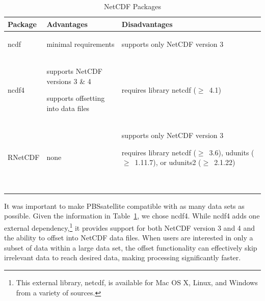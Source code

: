 \documentclass[11pt]{report}
\begin{document}
\begin{table}[!h]
  \raggedright
  \centering
  \caption{NetCDF Packages}
  \begin{tabular}{lp{2.65in}p{2.65in}} \hline
    \toprule
    \textbf{Package}
    & \textbf{Advantages}
    & \textbf{Disadvantages}
    \\\midrule
    ncdf
    & \begin{itemize*}
    \item minimal requirements
    \end{itemize*}
    & \begin{itemize*}
    \item supports only NetCDF version 3
    \end{itemize*}
    \\\midrule
    
    ncdf4
    & \begin{itemize*}
    \item supports NetCDF versions 3 \& 4\newline
    \item supports offsetting into data files
    \end{itemize*}
    & \begin{itemize*}
    \item requires library netcdf ($\ge$~4.1)
    \end{itemize*}
    \\\midrule

    RNetCDF
    & \begin{itemize*}
    \item none
    \end{itemize*}
    & \begin{itemize*}
    \item supports only NetCDF version 3\newline
    \item requires library netcdf ($\ge$~3.6),\newline
      \phantom{}\hspace{0.6em}udunits ($\ge$~1.11.7), or\newline
      \phantom{}\hspace{0.6em}udunits2 ($\ge$~2.1.22)
    \end{itemize*}~\\
    \bottomrule
  \end{tabular}
  \label{tab:libraries}
\end{table}

It was important to make PBSsatellite compatible with as many data sets as possible.
Given the information in Table~\ref{tab:libraries}, we chose ncdf4.
While ncdf4 adds one external dependency,\footnote{
  This external library, netcdf, is available for Mac OS X, Linux, and Windows from a variety of sources.}
it provides support for both NetCDF version 3 and 4 and the ability to offset into NetCDF data files.
When users are interested in only a subset of data within a large data set, the offset functionality can effectively skip irrelevant data to reach desired data, making processing significantly faster.
\end{document}
